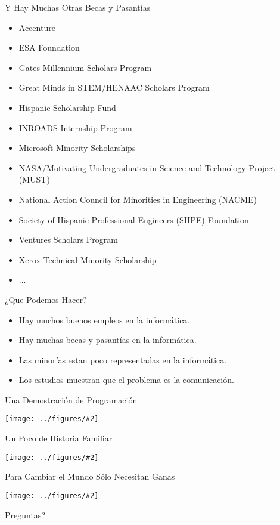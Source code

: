 \documentclass{beamer}
\newcommand{\fig}[2]{
  \texttt{[image: ../figures/\#2]}
}
\begin{document}
\begin{centering}
\begin{frame}[fragile]{Y Hay Muchas Otras Becas y Pasantías}
  \begin{itemize}
  \item Accenture
  \item ESA Foundation
  \item Gates Millennium Scholars Program
  \item Great Minds in STEM/HENAAC Scholars Program
  \item Hispanic Scholarship Fund
  \item INROADS Internship Program
  \item Microsoft Minority Scholarships
  \item NASA/Motivating Undergraduates in Science and Technology Project (MUST)
  \item National Action Council for Minorities in Engineering (NACME)
  \item Society of Hispanic Professional Engineers (SHPE) Foundation
  \item Ventures Scholars Program
  \item Xerox Technical Minority Scholarship
  \item ...
  \end{itemize}

  
\end{frame}

\begin{frame}[fragile]{¿Que Podemos Hacer?}

  \begin{itemize}
  \item Hay muchos buenos empleos en la informática.
  \item Hay muchas becas y pasantías en  la informática.
  \item Las minorías estan poco representadas en  la informática.
  \item Los estudios muestran que el problema es la comunicación.
  \end{itemize}

  \vfill\pause


\end{frame}

\begin{frame}[fragile]{Una Demostración de Programación}
  \fig{1.0}{blendershot}
  

\end{frame}

\begin{frame}[fragile]{Un Poco de Historia Familiar}
  \fig{1.0}{horseshoer}
\end{frame}


\begin{frame}[fragile]{Para Cambiar el Mundo Sólo Necesitan Ganas}
  \fig{1.0}{happycomputing}

  Preguntas?
  
\end{frame}


\end{centering}
\end{document}
